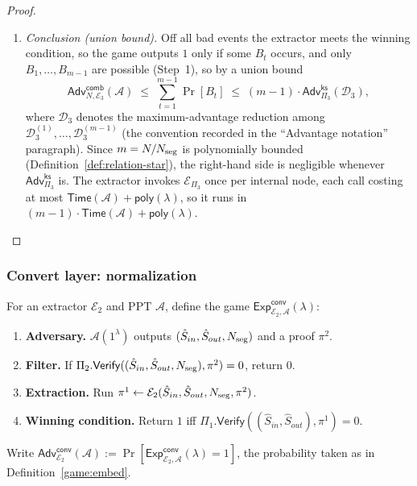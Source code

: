 \begin{proof}
\begin{enumerate}[label=\textbf{Step~\arabic*.},leftmargin=*,itemsep=5pt]
\item \emph{Conclusion (union bound).}
  Off all bad events the extractor meets the winning condition, so the game
  outputs $1$ only if some $B_t$ occurs, and only $B_1,\ldots,B_{m-1}$ are
  possible (Step~1), so by a union bound
  \[
    \mathsf{Adv}^{\mathsf{comb}}_{N,\mathcal{E}_3}(\mathcal{A})
    \;\le\;\sum_{t=1}^{m-1}\Pr[B_t]
    \;\le\;(m-1)\cdot\mathsf{Adv}^{\mathsf{ks}}_{\Pi_3}(\mathcal{D}_3),
  \]
  where $\mathcal{D}_3$ denotes the maximum-advantage reduction among
  $\mathcal{D}_3^{(1)},\ldots,\mathcal{D}_3^{(m-1)}$ (the convention recorded in
  the ``Advantage notation'' paragraph). Since $m=N/N_{\mathrm{seg}}$ is polynomially
  bounded (Definition~\ref{def:relation-star}), the right-hand side is negligible whenever
  $\mathsf{Adv}^{\mathsf{ks}}_{\Pi_3}$ is. The extractor invokes
  $\mathcal{E}_{\Pi_3}$ once per internal node, each call costing at most
  $\mathsf{Time}(\mathcal{A})+\mathsf{poly}(\lambda)$, so it runs in
  $(m-1)\cdot\mathsf{Time}(\mathcal{A})+\mathsf{poly}(\lambda)$.
\end{enumerate}
\end{proof}

\subsubsection{Convert layer: normalization}\label{sec:lem:convert}

\begin{definition}\label{game:convert}
For an extractor $\mathcal{E}_2$ and PPT $\mathcal{A}$, define the game
$\mathsf{Exp}^{\mathsf{conv}}_{\mathcal{E}_2,\mathcal{A}}(\lambda)$:
\begin{enumerate}
  \item \textbf{Adversary.} $\mathcal{A}(1^\lambda)$ outputs
    $(\hat{S}_{in},\hat{S}_{out},N_{\mathrm{seg}})$ and a proof $\pi^2$.
  \item \textbf{Filter.} If
    $\Pi_2.\mathsf{Verify}((\hat{S}_{in},\hat{S}_{out},N_{\mathrm{seg}}),\pi^2)=0$,
    return $0$.
  \item \textbf{Extraction.} Run
    $\pi^1\leftarrow\mathcal{E}_2(\hat{S}_{in},\hat{S}_{out},N_{\mathrm{seg}},\pi^2)$.
  \item \textbf{Winning condition.} Return $1$ iff
    $\Pi_1.\mathsf{Verify}((\hat{S}_{in},\hat{S}_{out}),\pi^1)=0$.
\end{enumerate}
Write $\mathsf{Adv}^{\mathsf{conv}}_{\mathcal{E}_2}(\mathcal{A}) :=
\Pr[\mathsf{Exp}^{\mathsf{conv}}_{\mathcal{E}_2,\mathcal{A}}(\lambda)=1]$,
the probability taken as in Definition~\ref{game:embed}.
\end{definition}

